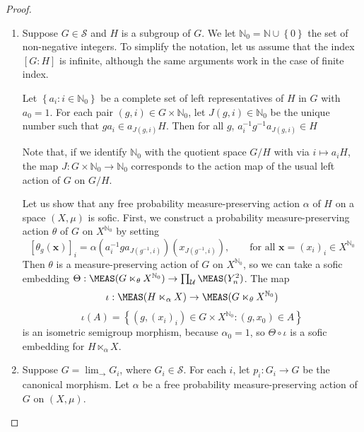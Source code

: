 \begin{proof}
\begin{enumerate}
\item[(a)] Suppose $G\in\mathscr{S}$ and $H$ is a subgroup of $G$. We let $\mathbb{N}_0=\mathbb{N}\cup\left\{0\right\}$ the set of non-negative integers. To simplify the notation, let us assume that the index $[G:H]$ is infinite, although the same arguments work in the case of finite index.

Let $\left\{a_i:i\in\mathbb{N}_0\right\}$ be a complete set of left representatives of $H$ in $G$ with $a_0=1$.
For each pair $(g,i)\in G\times \mathbb{N}_0$, let $J(g,i)\in\mathbb{N}_0$ be the unique number such that $ga_i\in a_{J(g,i)} H$. Then for all $g$, $a_i^{-1}g^{-1}a_{J(g,i)}\in H$

Note that, if we identify $\mathbb{N}_0$ with the quotient space $G/H$ with via $i\mapsto a_iH$, the map $J:G\times\mathbb{N}_0\to\mathbb{N}_0$ corresponds to the action map of the usual left action of $G$ on $G/H$.

Let us show that any free probability measure-preserving action $\alpha$ of $H$ on a space $(X,\mu)$ is sofic. First, we construct a probability measure-preserving action $\theta$ of $G$ on $X^{\mathbb{N}_0}$ by setting
\[\left[\theta_g({\mathbf{x}})\right]_i=\alpha(a_i^{-1}ga_{J(g^{-1},i)})(x_{J(g^{-1},i)}),\qquad\text{for all }{\mathbf{x}}=(x_i)_i\in X^{\mathbb{N}_0}\]
Then $\theta$ is a measure-preserving action of $G$ on $X^{\mathbb{N}_0}$, so we can take a sofic embedding $\Theta:\MEAS(G\ltimes_\theta X^{\mathbb{N}_0})\to\prod_\mathcal{U}\MEAS(Y_n^2)$. The map
\[\iota:\MEAS(H\ltimes_\alpha X)\to\MEAS(G\ltimes_\theta X^{\mathbb{N}_0})\]
\[\iota(A)=\left\{(g,(x_i)_i)\in G\times X^{\mathbb{N}_0}:(g,x_0)\in A\right\}\]
is an isometric semigroup morphism, because $\alpha_0=1$, so $\Theta\circ\iota$ is a sofic embedding for $H\ltimes_\alpha X$.
\item[(b)] Suppose $G=\displaystyle{\lim_{\longrightarrow}}G_i$, where $G_i\in\mathscr{S}$. For each $i$, let $p_i:G_i\to G$ be the canonical morphism. Let $\alpha$ be a free probability measure-preserving action of $G$ on $(X,\mu)$.


\end{enumerate}
\end{proof}
